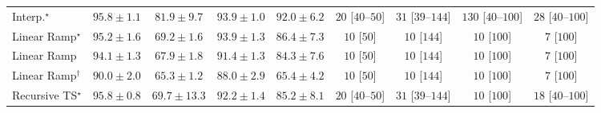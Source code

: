 \begin{tabular}{l|cccc|cccc|}
Interp.$^\star$ & {\cellcolor[HTML]{6B2606}} \color[HTML]{F1F1F1} $95.8\pm 1.1$ & {\cellcolor[HTML]{DD5F0C}} \color[HTML]{F1F1F1} $81.9\pm 9.7$ & {\cellcolor[HTML]{7C2C05}} \color[HTML]{F1F1F1} $93.9\pm 1.0$ & {\cellcolor[HTML]{8E3104}} \color[HTML]{F1F1F1} $92.0\pm 6.2$ & {\cellcolor[HTML]{FFF4F0}} \color[HTML]{000000} $20$ [$40$--$50$] & {\cellcolor[HTML]{FFF2EE}} \color[HTML]{000000} $31$ [$39$--$144$] & {\cellcolor[HTML]{FDD9D6}} \color[HTML]{000000} $130$ [$40$--$100$] & {\cellcolor[HTML]{FFF3EF}} \color[HTML]{000000} $28$ [$40$--$100$] \\
Linear Ramp$^\star$ & {\cellcolor[HTML]{712806}} \color[HTML]{F1F1F1} $95.2\pm 1.6$ & {\cellcolor[HTML]{FEBB47}} \color[HTML]{000000} $69.2\pm 1.6$ & {\cellcolor[HTML]{7C2C05}} \color[HTML]{F1F1F1} $93.9\pm 1.3$ & {\cellcolor[HTML]{C04602}} \color[HTML]{F1F1F1} $86.4\pm 7.3$ & {\cellcolor[HTML]{FFF7F3}} \color[HTML]{000000} $10$ [$50$] & {\cellcolor[HTML]{FFF7F3}} \color[HTML]{000000} $10$ [$144$] & {\cellcolor[HTML]{FFF7F3}} \color[HTML]{000000} $10$ [$100$] & {\cellcolor[HTML]{FFF7F3}} \color[HTML]{000000} $7$ [$100$] \\
Linear Ramp & {\cellcolor[HTML]{7B2B05}} \color[HTML]{F1F1F1} $94.1\pm 1.3$ & {\cellcolor[HTML]{FEC550}} \color[HTML]{000000} $67.9\pm 1.8$ & {\cellcolor[HTML]{933204}} \color[HTML]{F1F1F1} $91.4\pm 1.3$ & {\cellcolor[HTML]{D05104}} \color[HTML]{F1F1F1} $84.3\pm 7.6$ & {\cellcolor[HTML]{FFF7F3}} \color[HTML]{000000} $10$ [$50$] & {\cellcolor[HTML]{FFF7F3}} \color[HTML]{000000} $10$ [$144$] & {\cellcolor[HTML]{FFF7F3}} \color[HTML]{000000} $10$ [$100$] & {\cellcolor[HTML]{FFF7F3}} \color[HTML]{000000} $7$ [$100$] \\
Linear Ramp$^\dagger$ & {\cellcolor[HTML]{A03704}} \color[HTML]{F1F1F1} $90.0\pm 2.0$ & {\cellcolor[HTML]{FED36F}} \color[HTML]{000000} $65.3\pm 1.2$ & {\cellcolor[HTML]{B13F03}} \color[HTML]{F1F1F1} $88.0\pm 2.9$ & {\cellcolor[HTML]{FED26D}} \color[HTML]{000000} $65.4\pm 4.2$ & {\cellcolor[HTML]{FFF7F3}} \color[HTML]{000000} $10$ [$50$] & {\cellcolor[HTML]{FFF7F3}} \color[HTML]{000000} $10$ [$144$] & {\cellcolor[HTML]{FFF7F3}} \color[HTML]{000000} $10$ [$100$] & {\cellcolor[HTML]{FFF7F3}} \color[HTML]{000000} $7$ [$100$] \\
Recursive TS$^\star$ & {\cellcolor[HTML]{6B2606}} \color[HTML]{F1F1F1} $95.8\pm 0.8$ & {\cellcolor[HTML]{FEB744}} \color[HTML]{000000} $69.7\pm 13.3$ & {\cellcolor[HTML]{8C3004}} \color[HTML]{F1F1F1} $92.2\pm 1.4$ & {\cellcolor[HTML]{CB4B02}} \color[HTML]{F1F1F1} $85.2\pm 8.1$ & {\cellcolor[HTML]{FFF4F0}} \color[HTML]{000000} $20$ [$40$--$50$] & {\cellcolor[HTML]{FFF2EE}} \color[HTML]{000000} $31$ [$39$--$144$] & {\cellcolor[HTML]{FFF7F3}} \color[HTML]{000000} $10$ [$100$] & {\cellcolor[HTML]{FFF5F1}} \color[HTML]{000000} $18$ [$40$--$100$] \\

\end{tabular}
